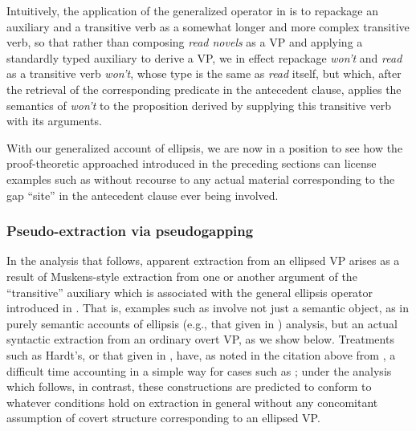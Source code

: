 \documentclass[output=paper,colorlinks,citecolor=brown]{langscibook}
\begin{document}
Intuitively, the application of the generalized operator in
 is to repackage an auxiliary and a transitive verb as a
somewhat longer and more complex transitive verb, so that rather than
composing \textit{read novels} as a VP and applying a standardly typed
auxiliary to derive a VP, we in effect repackage \textit{won't} and \textit{read} as
a transitive verb \textit{won't}, whose type is the same as \textit{read} itself,
but which, after the retrieval of the corresponding predicate in the
antecedent clause, applies the semantics of \textit{won't} to the proposition
derived by supplying this transitive verb with its arguments.

With our generalized account of ellipsis, we are now in a position to
see how the proof-theoretic approached introduced in the preceding
sections can license examples such as  without
recourse to any actual material corresponding to the gap ``site'' in the
antecedent clause ever being involved.

\subsubsection{Pseudo-extraction via pseudogapping}\label{subsubsec:pseudoextrac}

In the analysis that follows, apparent extraction from an ellipsed VP
arises as a result of Muskens-style extraction from one or another
argument of the ``transitive'' auxiliary which is associated with the
general ellipsis operator introduced in
. That is, examples such as
 involve not just a semantic object, as in purely
semantic accounts of ellipsis (e.g., that given in \citealt{hardt-diss})
analysis, but an actual syntactic extraction from an ordinary overt
VP, as we show below. Treatments such as Hardt's, or that given in
\citet{dalrymple-etal1991}, have, as noted in the citation above from
\citet{Elbourne2008}, a difficult time accounting in a simple way for cases
such as ; under the analysis which follows, in
contrast, these constructions are predicted to conform to whatever
conditions hold on extraction in general without any concomitant
assumption of covert structure corresponding to an ellipsed VP.
\end{document}

